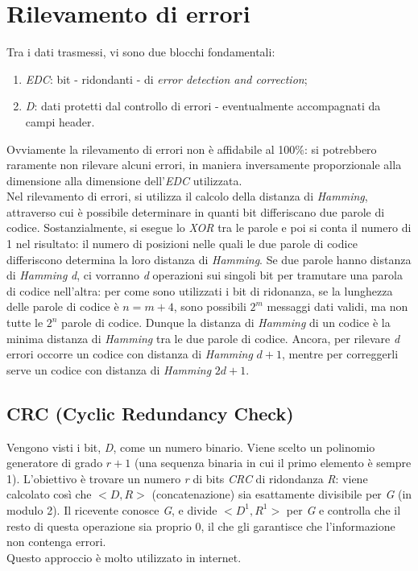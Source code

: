 \section{Rilevamento di errori}
Tra i dati trasmessi, vi sono due blocchi fondamentali:
\begin{enumerate}
	\item \textit{EDC}: bit - ridondanti - di \textit{error detection and correction};
	\item \textit{D}: dati protetti dal controllo di errori - eventualmente accompagnati da campi header.
\end{enumerate}
Ovviamente la rilevamento di errori non è affidabile al 100\%: si potrebbero raramente non rilevare alcuni errori, in maniera inversamente proporzionale alla dimensione alla dimensione dell'\textit{EDC} utilizzata. \\
Nel rilevamento di errori, si utilizza il calcolo della distanza di \textit{Hamming}, attraverso cui è possibile determinare in quanti bit differiscano due parole di codice. Sostanzialmente, si esegue lo \textit{XOR} tra le parole e poi si conta il numero di 1 nel risultato: il numero di posizioni nelle quali le due parole di codice differiscono determina la loro distanza di \textit{Hamming}. Se due parole hanno distanza di \textit{Hamming} \textit{d}, ci vorranno \textit{d} operazioni sui singoli bit per tramutare una parola di codice nell'altra: per come sono utilizzati i bit di ridonanza, se la lunghezza delle parole di codice è $n=m+4$, sono possibili $2^m$ messaggi dati validi, ma non tutte le $2^n$ parole di codice. Dunque la distanza di \textit{Hamming} di un codice è la minima distanza di \textit{Hamming} tra le due parole di codice. Ancora, per rilevare \textit{d} errori occorre un codice con distanza di \textit{Hamming} $d+1$, mentre per correggerli serve un codice con distanza di \textit{Hamming} $2d+1$.

\subsection{CRC (Cyclic Redundancy Check)}
Vengono visti i bit, \textit{D}, come un numero binario. Viene scelto un polinomio generatore di grado $r+1$ (una sequenza binaria in cui il primo elemento è sempre 1). L'obiettivo è trovare un numero \textit{r} di bits \textit{CRC} di ridondanza \textit{R}: viene calcolato così che $<D,R>$ (concatenazione) sia esattamente divisibile per \textit{G} (in modulo 2). Il ricevente conosce \textit{G}, e divide $<D^1,R^1>$ per \textit{G} e controlla che il resto di questa operazione sia proprio 0, il che gli garantisce che l'informazione non contenga errori. \\
Questo approccio è molto utilizzato in internet.


